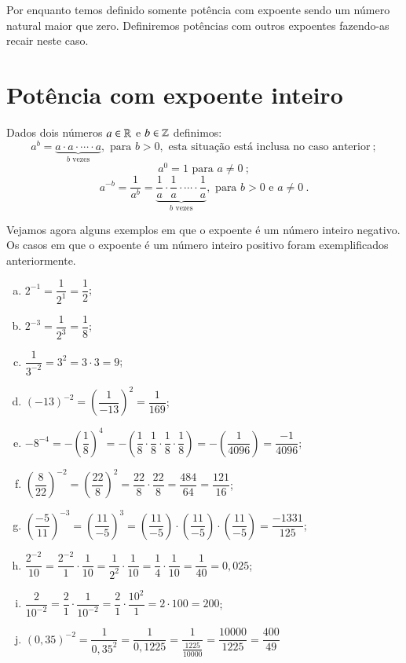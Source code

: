  Por enquanto temos definido somente potência com expoente sendo um número natural maior que zero. Definiremos potências com outros expoentes fazendo-as recair neste caso.

 \section{Potência com expoente inteiro}
 \vskip0.3cm

 \colorbox{azul}{
 \begin{minipage}{0.9\linewidth}
 \begin{center}
   Dados dois números $a \in \mathbb{R}$ e $b \in \mathbb{Z}$ definimos:
 \[a^b= \underbrace{a \cdot a \cdot \cdots \cdot a}_{b \text{ vezes}}, \text{ para } b > 0, \text{ esta situação está inclusa no caso anterior} \ ;\]
 \[a^{0}= 1 \text{ para } a \neq 0 \ ;\]
 \[a^{-b}= \dfrac{1}{a^b}= \underbrace{\dfrac{1}{a} \cdot \dfrac{1}{a} \cdot \cdots \cdot \dfrac{1}{a}}_{b \text{ vezes}}, \text{ para } b>0 \text{ e } a \neq 0 \ .\]
 \end{center}
 \end{minipage}}

 \vskip0.3cm

 \begin{exem}
 Vejamos agora alguns exemplos em que o expoente é um número inteiro negativo. Os casos em que o expoente é um número inteiro positivo foram exemplificados anteriormente.

 \begin{enumerate}[a)]
  \item $2^{-1}= \dfrac{1}{2^{1}}= \dfrac{1}{2}$;
  \item $2^{-3}= \dfrac{1}{2^3}= \dfrac{1}{8}$;
  \item $\dfrac{1}{3^{-2}}= 3^2= 3 \cdot 3= 9$;
  \item $(-13)^{-2}= \left( \dfrac{1}{-13} \right)^{2}= \dfrac{1}{169}$;
  \item $-8^{-4}= -\left( \dfrac{1}{8} \right)^{4}= -\left( \dfrac{1}{8} \cdot \dfrac{1}{8} \cdot \dfrac{1}{8} \cdot \dfrac{1}{8} \right)= -\left( \dfrac{1}{4096} \right)= \dfrac{-1}{4096}$;
  \item $\left( \dfrac{8}{22} \right)^{-2}= \left( \dfrac{22}{8} \right)^{2}= \dfrac{22}{8} \cdot \dfrac{22}{8}= \dfrac{484}{64}= \dfrac{121}{16}$;
  \item $\left( \dfrac{-5}{11} \right)^{-3}= \left( \dfrac{11}{-5} \right)^{3}= \left( \dfrac{11}{-5} \right) \cdot \left( \dfrac{11}{-5} \right) \cdot \left( \dfrac{11}{-5} \right)= \dfrac{-1331}{125}$;
  \item $\dfrac{2^{-2}}{10}= \dfrac{2^{-2}}{1} \cdot \dfrac{1}{10}= \dfrac{1}{2^{2}} \cdot \dfrac{1}{10}= \dfrac{1}{4} \cdot \dfrac{1}{10}= \dfrac{1}{40}= 0,025$;
  \item $\dfrac{2}{10^{-2}}= \dfrac{2}{1} \cdot \dfrac{1}{10^{-2}}= \dfrac{2}{1} \cdot \dfrac{10^{2}}{1}= 2 \cdot 100= 200$;
  \item $(0,35)^{-2}= \dfrac{1}{0,35^{2}}= \dfrac{1}{0,1225}= \dfrac{1}{\frac{1225}{10000}}= \dfrac{10000}{1225}= \dfrac{400}{49}$
 \end{enumerate}

 \end{exem}

